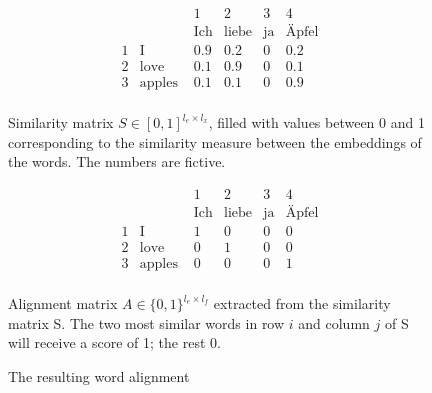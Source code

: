 \begin{figure}[ht]
\[
	\begin{array}{rl|c|c|c|c}
& &1 & 2 & 3 & 4\\
& &\text{Ich} & \text{liebe} & \text{ja} & \text{Äpfel} \\
\hline
1 & \text{I} & 0.9 & 0.2 & 0 &0.2 \\ 
\hline
2 & \text{love} & 0.1 & 0.9 &0 & 0.1 \\
\hline
3 & \text{apples } & 0.1& 0.1 & 0 & 0.9\\
\end{array}
\]
\captionsetup{width=.6\linewidth}
\caption[Similarity matrix]{Similarity matrix $S \in [0,1]^{l_e \times l_x}$, filled with values between 0 and 1 corresponding to the similarity measure between the embeddings of the words. 
The numbers are fictive.}
\label{fig:sim-matrix}
\end{figure}

\begin{figure}[ht]
\[
	\begin{array}{rl|c|c|c|c}
& &1 & 2 & 3 & 4\\
& &\text{Ich} & \text{liebe} & \text{ja} & \text{Äpfel} \\
\hline
1 & \text{I} & 1 & 0 & 0 & 0 \\ 
\hline
2 & \text{love} & 0 & 1 &0 & 0 \\
\hline
3 & \text{apples } & 0& 0 & 0 & 1\\
\end{array}
\]
\captionsetup{width=.6\linewidth}
\caption[Alignment matrix]{Alignment matrix $A \in \{0,1\}^{l_e \times l_f}$ extracted from the similarity matrix S. The two most similar words in row $i$ and column $j$ of S will receive a score of 1; the rest 0.}
\label{fig:al-matrix}
\end{figure}
\begin{figure}
\centering

    

\vspace*{1cm}

   
\caption{The resulting word alignment}
\label{fig:resulting-alignment}
\end{figure}


